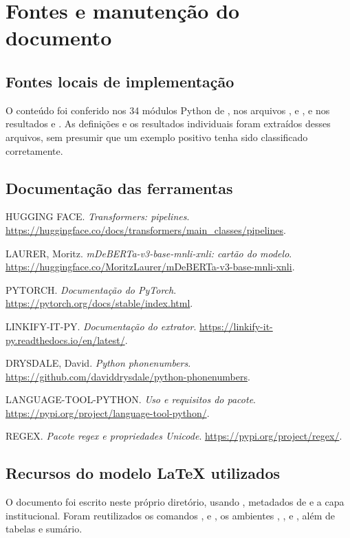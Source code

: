 \section{Fontes e manutenção do documento}
\subsection{Fontes locais de implementação}
O conteúdo foi conferido nos 34 módulos Python de , nos arquivos ,  e , e nos resultados  e . As definições e os resultados individuais foram extraídos desses arquivos, sem presumir que um exemplo positivo tenha sido classificado corretamente.

\subsection{Documentação das ferramentas}
\begin{enumerate}[label={\textbf{[\arabic*]}},leftmargin=2.2em,itemsep=0.8em]
\item HUGGING FACE. \textit{Transformers: pipelines}. \url{https://huggingface.co/docs/transformers/main_classes/pipelines}.
\item LAURER, Moritz. \textit{mDeBERTa-v3-base-mnli-xnli: cartão do modelo}. \url{https://huggingface.co/MoritzLaurer/mDeBERTa-v3-base-mnli-xnli}.
\item PYTORCH. \textit{Documentação do PyTorch}. \url{https://pytorch.org/docs/stable/index.html}.
\item LINKIFY-IT-PY. \textit{Documentação do extrator}. \url{https://linkify-it-py.readthedocs.io/en/latest/}.
\item DRYSDALE, David. \textit{Python phonenumbers}. \url{https://github.com/daviddrysdale/python-phonenumbers}.
\item LANGUAGE-TOOL-PYTHON. \textit{Uso e requisitos do pacote}. \url{https://pypi.org/project/language-tool-python/}.
\item REGEX. \textit{Pacote regex e propriedades Unicode}. \url{https://pypi.org/project/regex/}.
\end{enumerate}

\subsection{Recursos do modelo LaTeX utilizados}
O documento foi escrito neste próprio diretório, usando , metadados de  e a capa institucional. Foram reutilizados os comandos ,  e , os ambientes , ,  e , além de tabelas e sumário.

